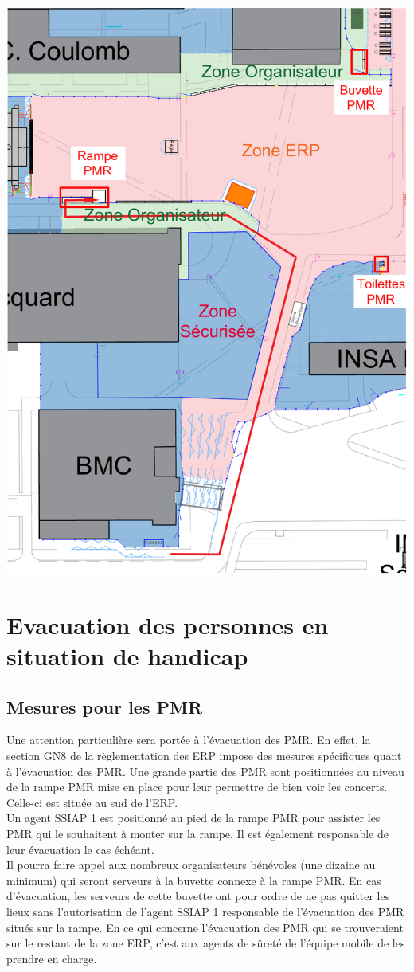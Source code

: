 \documentclass[hidelinks, paper=a4, fontsize=13pt]{report}
\begin{document}
\begin{center}
\includegraphics[width=.8\textwidth,keepaspectratio]{Exports/Plan_24h_44eme-PMR_sud}
\end{center}

\newpage
\section{Evacuation des personnes en situation de handicap}

\subsection{Mesures pour les PMR}

Une attention particulière sera portée à l’évacuation des PMR. En effet, la section GN8 de la règlementation des ERP impose des mesures spécifiques quant à l’évacuation des PMR.
Une grande partie des PMR sont positionnées au niveau de la rampe PMR mise en place pour leur permettre de bien voir les concerts. Celle-ci est située au sud de l’ERP.\\

Un agent SSIAP 1 est positionné au pied de la rampe PMR pour assister  les PMR qui le souhaitent à monter sur la rampe. Il est également responsable de leur évacuation le cas échéant.\\
Il pourra faire appel aux nombreux organisateurs bénévoles (une dizaine au minimum) qui seront serveurs à la buvette connexe à la rampe PMR. En cas d’évacuation, les serveurs de cette buvette ont pour ordre de ne pas quitter les lieux sans l’autorisation de l’agent SSIAP 1 responsable de l’évacuation des PMR situés sur la rampe.
En ce qui concerne l’évacuation des PMR qui se trouveraient sur le restant de la zone ERP, c’est aux agents de sûreté de l'équipe mobile de les prendre en charge. 
\end{document}

